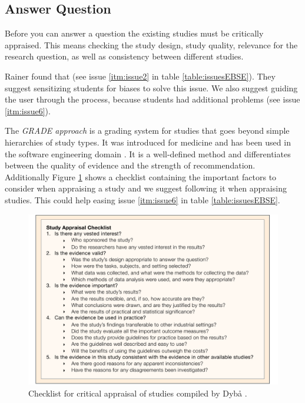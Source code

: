 
\subsection{Answer Question}
\label{subsec:answer question}

Before you can answer a question the existing studies must be critically appraised. This means checking the study design, study quality, relevance for the research question, as well as consistency between different studies. 

Rainer \etal found that  \cite{Rainer2006} (see issue \ref{itm:issue2} in table \ref{table:issuesEBSE}). They suggest sensitizing students for biases to solve this issue. We also suggest guiding the user through the process, because students had additional problems (see issue \ref{itm:issue6}). 

The \emph{GRADE approach} \cite{Atkins2004} is a grading system for studies that goes beyond simple hierarchies of study types. It was introduced for medicine and has been used in the software engineering domain \cite{Wohlin2013EvidenceProfile,Dyba2008}. It is a well-defined method and differentiates between the quality of evidence and the strength of recommendation. Additionally Figure \ref{fig:critical appraisal} shows a checklist containing the important factors to consider when appraising a study and we suggest following it when appraising studies. This could help easing issue \ref{itm:issue6} in table \ref{table:issuesEBSE}.

\begin{figure}
	\centering
	\includegraphics[width=12cm]{figures/study_appraisal.pdf}
\caption{Checklist for critical appraisal of studies compiled by Dyb{\aa} \etal \cite{Dyba2005}.}
\label{fig:critical appraisal}
\end{figure}

